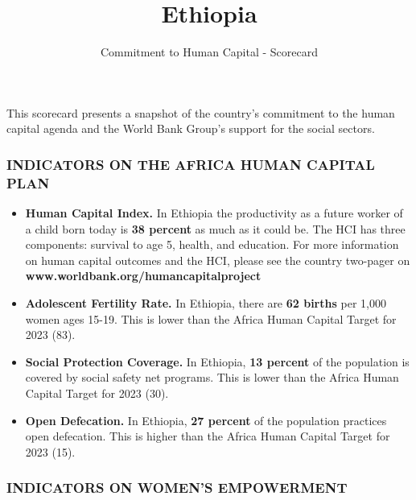 \documentclass[9.2pt,twocolumn]{article}
\title{Ethiopia}
\author{Commitment to Human Capital - Scorecard}
\date{}
\begin{document}
\maketitle

\newcommand\boldblue[1]{\textcolor{bondiblue}{\textbf{#1}}}

This scorecard presents a snapshot of the country's commitment to the
human capital agenda and the World Bank Group's support for the social
sectors.

\hypertarget{section}{%
\subsubsection{\texorpdfstring{\textcolor{bondiblue}{\textbf{I\small{NDICATORS ON THE AFRICA HUMAN CAPITAL PLAN}}}}{}}\label{section}}

\begin{itemize}
\item
  \textbf{Human Capital Index.} In Ethiopia the productivity as a future
  worker of a child born today is \textbf{38 percent} as much as it
  could be. The HCI has three components: survival to age 5, health, and
  education. For more information on human capital outcomes and the HCI,
  please see the country two-pager on
  \textcolor{bondiblue}{\textbf{www.worldbank.org/humancapitalproject}}
\item
  \textbf{Adolescent Fertility Rate.} In Ethiopia, there are \textbf{62
  births} per 1,000 women ages 15-19. This is lower than the Africa
  Human Capital Target for 2023 (83).
\item
  \textbf{Social Protection Coverage.} In Ethiopia, \textbf{13 percent}
  of the population is covered by social safety net programs. This is
  lower than the Africa Human Capital Target for 2023 (30).
\item
  \textbf{Open Defecation.} In Ethiopia, \textbf{27 percent} of the
  population practices open defecation. This is higher than the Africa
  Human Capital Target for 2023 (15).
\end{itemize}

\hypertarget{section-1}{%
\subsubsection{\texorpdfstring{\textcolor{bondiblue}{\textbf{I\small{NDICATORS ON WOMEN'S EMPOWERMENT}}}}{}}\label{section-1}}
\end{document}
